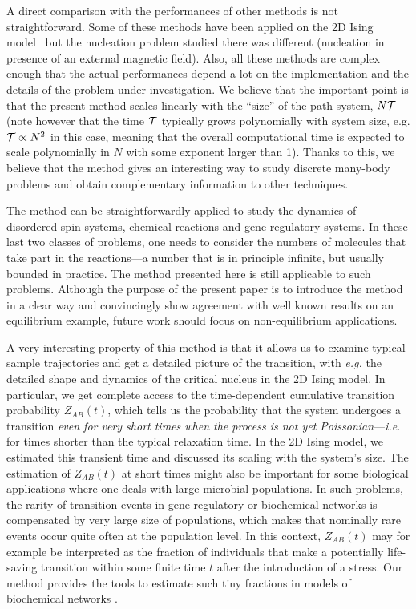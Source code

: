 \documentclass[aps,twocolumn,floats,pre,amsmath,superscriptaddress]{revtex4}
\def\TT{{\cal T}}\def\NN{{\cal N}} \def\BB{{\cal B}}\def\II{{\cal I}}
\newcommand{\<}{\langle}
\renewcommand{\>}{\rangle}
\begin{document}
A direct comparison with the performances of 
other methods is not straightforward. Some of these methods
have been applied on the 2D Ising model~\cite{shearising, venturoli} but the nucleation 
problem studied there was different (nucleation in presence of an external magnetic field).
Also, all these methods are complex enough that the actual performances depend a lot
on the implementation and the details of the problem under investigation.
We believe that the important point is that the present method scales linearly with the ``size''
of the path system, $N \TT$ (note however that the time $\TT$ typically grows polynomially with 
system size, e.g. $\TT \propto N^2$ in this case, meaning that the overall computational time
is expected to scale polynomially in $N$ with some exponent larger than 1). Thanks to this,
we believe that the method gives an interesting way to study discrete many-body problems
and obtain complementary information to other techniques.



The method can be straightforwardly
applied to study the dynamics of disordered spin systems,  chemical
reactions and gene regulatory systems.  In these last two classes of
problems, one needs to consider the numbers of molecules that take
part in the reactions---a number that is in principle infinite, but
usually bounded in practice. The method presented here is still
applicable to such problems. Although the purpose of the present paper is to
introduce the method in a clear way and convincingly show agreement
with well known results on an
equilibrium example, future work should focus on non-equilibrium
applications.

A very interesting property of this method is that it allows us to examine typical
sample trajectories and get a detailed picture of the transition, with
{\em e.g.}
the detailed shape and dynamics of the critical nucleus in the 2D
Ising model.
In particular,
we get complete access to the time-dependent cumulative
transition probability $Z_{AB}(t)$, which tells us the probability that
the system undergoes a transition {\it even for very short times when the
process
is not yet Poissonian}---{\em i.e.} for times shorter than the typical
relaxation time. In the 2D Ising model, we estimated this transient
time and discussed its scaling with the system's size. The estimation
of $Z_{AB}(t)$ at short times
might also be important for some biological applications where
one deals with large microbial populations. In such
problems, the rarity of transition events in gene-regulatory or
biochemical networks is compensated by very large size of
populations, which makes that nominally rare events occur quite often
at the population level. In this context, $Z_{AB}(t)$ may for example be
interpreted as the fraction of individuals that make a potentially
life-saving transition within some finite time $t$ after the
introduction of a stress. Our method provides the tools to estimate
such tiny fractions in models of biochemical networks \cite{suel, vano}.
\end{document}
